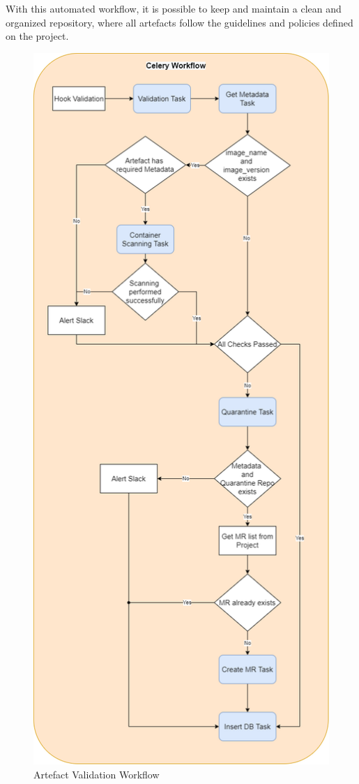\documentclass[a4paper,
               keeplastbox,   %
               ]{jacow}
\begin{document}
With this automated workflow, it is possible to keep and maintain a clean and organized repository, where all artefacts follow the guidelines and policies defined on the project.

\begin{figure}[!htb]
	\centering
	\includegraphics*[width=0.8\columnwidth]{Artefact-Validation-Workflow}
	\caption{Artefact Validation Workflow}
	\label{fig:Artefact-Validation-Workflow}
\end{figure}
\end{document}
